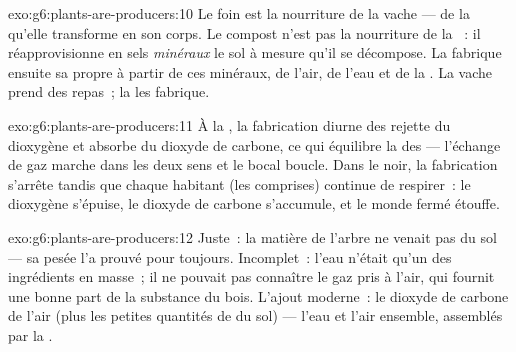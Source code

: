 \begin{solution}{exo:g6:plants-are-producers:10}
Le foin est la nourriture de la vache --- de la 
qu'elle transforme en son corps. Le compost n'est pas la nourriture
de la ~: il réapprovisionne en sels \emph{minéraux} le sol à
mesure qu'il se décompose. La  fabrique ensuite sa propre
 à partir de ces minéraux, de l'air, de l'eau et de
la . La vache prend des repas~; la  les fabrique.
\end{solution}

\begin{solution}{exo:g6:plants-are-producers:11}
À la , la fabrication diurne des  rejette du
dioxygène et absorbe du dioxyde de carbone, ce qui équilibre la
 des  --- l'échange de gaz marche dans les deux
sens et le bocal boucle. Dans le noir, la fabrication s'arrête
tandis que chaque habitant (les  comprises) continue de
respirer~: le dioxygène s'épuise, le dioxyde de carbone s'accumule,
et le monde fermé étouffe.
\end{solution}

\begin{solution}{exo:g6:plants-are-producers:12}
Juste~: la matière de l'arbre ne venait pas du sol --- sa pesée l'a
prouvé pour toujours. Incomplet~: l'eau n'était qu'un des
ingrédients en masse~; il ne pouvait pas connaître le gaz pris à
l'air, qui fournit une bonne part de la substance du bois. L'ajout
moderne~: le dioxyde de carbone de l'air (plus les petites quantités
de  du sol) --- l'eau et l'air ensemble, assemblés par
la .
\end{solution}

